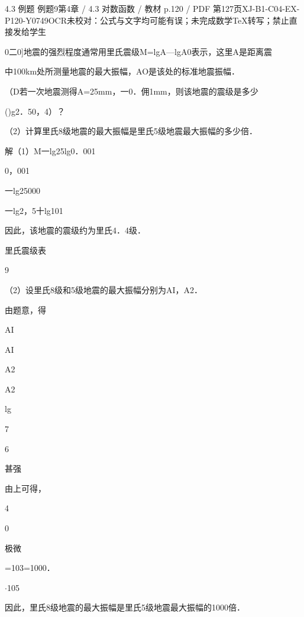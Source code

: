 \begin{bankitem}{4.3 例题 例题9}{第4章 / 4.3 对数函数 / 教材 p.120 / PDF 第127页}{XJ-B1-C04-EX-P120-Y0749}{OCR未校对：公式与文字均可能有误；未完成数学TeX转写；禁止直接发给学生}
\begin{ocrdraft}
\par
0二0]地震的强烈程度通常用里氏震级M=lgA—lgA0表示，这里A是距离震
\par
中100km处所测量地震的最大振幅，AO是该处的标准地震振幅．
\par
（D若一次地震测得A=25mm，一0．佣1mm，则该地震的震级是多少
\par
()g2．50，4）？
\par
（2）计算里氏8级地震的最大振幅是里氏5级地震最大振幅的多少倍．
\par
解（1）M一lg25lg0．001
\par
0，001
\par
一lg25000
\par
一lg2，5十lg101
\par
因此，该地震的震级约为里氏4．4级．
\par
里氏震级表
\par
9
\par
（2）设里氏8级和5级地震的最大振幅分别为AI，A2．
\par
由题意，得
\par
AI
\par
AI
\par
A2
\par
A2
\par
lg
\par
7
\par
6
\par
甚强
\par
由上可得，
\par
4
\par
0
\par
极微
\par
=103=1000．
\par
\ensuremath{\cdot}105
\par
因此，里氏8级地震的最大振幅是里氏5级地震最大振幅的1000倍．
\end{ocrdraft}
\end{bankitem}
